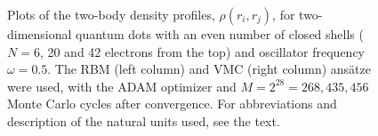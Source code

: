 \begin{figure}[H]
	\hspace{0.1cm}
	
	\caption{Plots of the two-body density profiles, $\rho(r_i, r_j)$, for two-dimensional quantum dots with an even number of closed shells ($N=6$, 20 and 42 electrons from the top) and oscillator frequency $\omega=0.5$. The RBM (left column) and VMC (right column) ansätze were used, with the ADAM optimizer and $M=2^{28}=268,435,456$ Monte Carlo cycles after convergence. For  abbreviations and description of the natural units used, see the text.}%
	\label{fig:TB_interaction_20P}
\end{figure}

